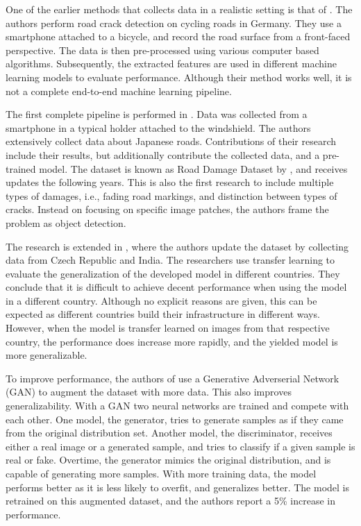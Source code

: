 One of the earlier methods that collects data in a realistic setting is that of . The authors perform road crack detection on cycling roads in Germany. They use a smartphone attached to a bicycle, and record the road surface from a front-faced perspective. The data is then pre-processed using various computer based algorithms. Subsequently, the extracted features are used in different machine learning models to evaluate performance. Although their method works well, it is not a complete end-to-end machine learning pipeline.

The first complete pipeline is performed in . Data was collected from a smartphone in a typical holder attached to the windshield. The authors extensively collect data about Japanese roads. Contributions of their research include their results, but additionally contribute the collected data, and a pre-trained model. The dataset is known as Road Damage Dataset by , and receives updates the following years. This is also the first research to include multiple types of damages, i.e., fading road markings, and distinction between types of cracks. Instead on focusing on specific image patches, the authors frame the problem as object detection.

The research is extended in , where the authors update the dataset by collecting data from Czech Republic and India. The researchers use transfer learning to evaluate the generalization of the developed model in different countries. They conclude that it is difficult to achieve decent performance when using the model in a different country. Although no explicit reasons are given, this can be expected as different countries build their infrastructure in different ways. However, when the model is transfer learned on images from that respective country, the performance does increase more rapidly, and the yielded model is more generalizable. 

To improve performance, the authors of  use a Generative Adverserial Network (GAN) to augment the dataset with more data. This also improves generalizability. With a GAN two neural networks are trained and compete with each other. One model, the generator, tries to generate samples as if they came from the original distribution set. Another model, the discriminator, receives either a real image or a generated sample, and tries to classify if a given sample is real or fake. Overtime, the generator mimics the original distribution, and is capable of generating more samples. With more training data, the model performs better as it is less likely to overfit, and generalizes better. The model is retrained on this augmented dataset, and the authors report a 5\% increase in performance.

